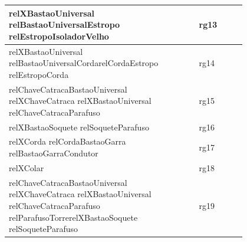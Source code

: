 \documentclass[12pt]{article}
\begin{document}
\begin{table}[H]
\begin{tabular}{|p{0.8\linewidth}|l|}
relXBastaoUniversal relBastaoUniversalEstropo relEstropoIsoladorVelho                                                                                                                                                                                                                                                                     & rg13        \\ \hline
relXBastaoUniversal relBastaoUniversalCordarelCordaEstropo relEstropoCorda                                                                                                                                                                                                                                                                & rg14        \\ \hline
relChaveCatracaBastaoUniversal relXChaveCatraca relXBastaoUniversal relChaveCatracaParafuso                                                                                                                                                                                                                                               & rg15        \\ \hline
relXBastaoSoquete relSoqueteParafuso                                                                                                                                                                                                                                                                                                      & rg16        \\ \hline
relXCorda relCordaBastaoGarra relBastaoGarraCondutor                                                                                                                                                                                                                                                                                      & rg17        \\ \hline
relXColar                                                                                                                                                                                                                                                                                                                                 & rg18        \\ \hline
relChaveCatracaBastaoUniversal relXChaveCatraca relXBastaoUniversal relChaveCatracaParafuso relParafusoTorrerelXBastaoSoquete relSoqueteParafuso                                                                                                                                                                                           & rg19        \\ \hline

\end{tabular}
\end{table}
\end{document}
